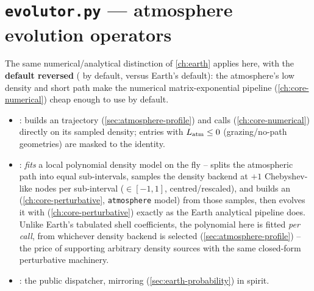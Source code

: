 \section{\texttt{evolutor.py} --- atmosphere evolution operators}
\label{sec:atmosphere-evolutor}


\begin{implbox}
The same numerical/analytical distinction of \cref{ch:earth}
applies here, with the \textbf{default reversed} (
by default, versus Earth's  default): the atmosphere's
low density and short path make the numerical matrix-exponential pipeline
(\cref{ch:core-numerical}) cheap enough to use by default.
\begin{itemize}
  \item {}: builds an
     trajectory (\cref{sec:atmosphere-profile})
    and calls  (\cref{ch:core-numerical})
    directly on its sampled density; entries with $L_{\rm atm}\le0$
    (grazing/no-path geometries) are masked to the identity.
  \item {}: \emph{fits} a local
    polynomial density model on the fly -- splits the atmospheric path
    into  equal sub-intervals, samples the
    density backend at $+1$ Chebyshev-like nodes
    per sub-interval ($\in[-1,1]$, centred/rescaled), and builds an
    (\cref{ch:core-perturbative}, \texttt{atmosphere} model) from those
    samples, then evolves it with
     (\cref{ch:core-perturbative})
    exactly as the Earth analytical pipeline does. Unlike Earth's
    tabulated shell coefficients, the polynomial here is fitted
    \emph{per call}, from whichever density backend is selected
    (\cref{sec:atmosphere-profile}) -- the price of supporting arbitrary
    density sources with the same closed-form perturbative machinery.
  \item {}: the public dispatcher, mirroring
     (\cref{sec:earth-probability}) in
    spirit.
\end{itemize}
\end{implbox}

